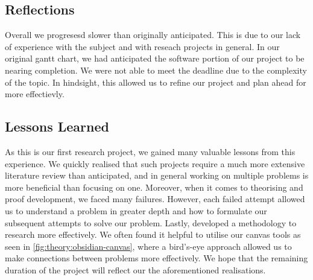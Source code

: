 \subsection{Reflections}

Overall we progresesd slower than originally anticipated. This 
is due to our lack of experience with the subject and with reseach projects in general.
In our original gantt chart, we had anticipated the software portion of our project
to be nearing completion. We were not able to meet the deadline due to the complexity
of the topic. In hindsight, this allowed us to refine our project and plan ahead
for more effectievly. 

\subsection{Lessons Learned}

As this is our first research project, we gained many valuable lessons from this experience.
We quickly realised that such projects require a much more extensive literature review than anticipated, 
and in general working on multiple problems is more beneficial than focusing on one.
Moreover, when it comes to theorising and proof development, we faced many failures.
However, each failed attempt allowed us to understand a problem in greater depth and how to formulate our subsequent attempts to solve our problem.
Lastly, developed a methodology to research more effectively. We often found it helpful
to utilise our canvas tools as seen in \ref{fig:theory:obsidian-canvas}, where
a bird's-eye approach allowed us to make connections between problems more effectively.
We hope that the remaining duration of the project will reflect our the aforementioned realisations.


